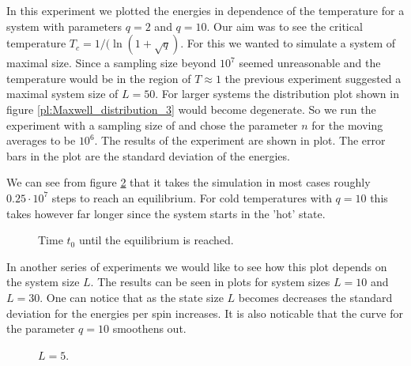 In this experiment we plotted the energies in dependence of the temperature for a system with parameters $q=2$ and $q=10$. Our aim was to see the critical temperature $T_c=1/(\ln(1+\sqrt{q})$. For this we wanted to simulate a system of maximal size. Since a sampling size beyond $10^7$ seemed unreasonable and the temperature would be in the region of $T\approx1$ the previous experiment suggested a maximal system size of $L=50$. For larger systems the distribution plot shown in figure \ref{pl:Maxwell_distribution_3} would become degenerate.
So we run the experiment with a sampling size of  and chose the parameter $n$ for the moving averages to be $10^6$. The results of the experiment are shown in plot. The error bars in the plot are the standard deviation of the energies.

\begin{figure}
\centering
\begin{minipage}{0.7\textwidth}
\centering
\graphicspath{{../../Plots/}}

\caption{}
\label{fi:energies_T_q_L50}
\end{minipage}
\end{figure}

We can see from figure \ref{fi:t0_T_q_L50} that it takes the simulation in most cases roughly $0.25\cdot 10^7$ steps to reach an equilibrium. For cold temperatures with $q=10$ this takes however far longer since the system starts in the 'hot' state.

\begin{figure}
\centering
\begin{minipage}{0.7\textwidth}
\centering
\graphicspath{{../../Plots/}}

\caption{Time $t_0$ until the equilibrium is reached.}
\label{fi:t0_T_q_L50}
\end{minipage}
\end{figure}

In another series of experiments we would like to see how this plot depends on the system size $L$. The results can be seen in plots for system sizes $L=10$ and $L=30$. One can notice that as the state size $L$ becomes decreases the standard deviation for the energies per spin increases. It is also noticable that the curve for the parameter $q=10$ smoothens out.

\begin{figure}
\centering
\begin{minipage}{0.7\textwidth}
\centering
\graphicspath{{../../Plots/}}

\caption{$L=5$.}
\label{fi:energies_T_q_L5}
\end{minipage}
\end{figure}

